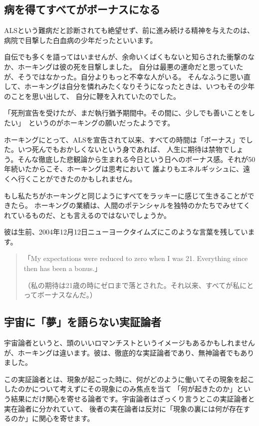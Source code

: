 \documentclass[10pt,b5paper,papersize,dvipdfmx]{jsbook}
\begin{document}
\subsection{病を得てすべてがボーナスになる}
ALSという難病だと診断されても絶望せず、前に進み続ける精神を与えたのは、病院で目撃した白血病の少年だったといいます。\par
自伝でも多くを語ってはいませんが、余命いくばくもないと知らされた衝撃のなか、ホーキングは彼の死を目撃しました。
自分は最悪の運命だと思っていたが、そうではなかった。自分よりもっと不幸な人がいる。
そんなふうに思い直して、ホーキングは自分を憐れみたくなりそうになったときは、いつもその少年のことを思い出して、
自分に鞭を入れていたのでした。\par
「死刑宣告を受けたが、まだ執行猶予期間中。その間に、少しでも善いことをしたい」\,
というのがホーキングの願いだったようです。\par
ホーキングにとって、ALSを宣告されて以来、すべての時間は「ボーナス」でした。いつ死んでもおかしくないという身であれば、
人生に期待は禁物でしょう。そんな徹底した悲観論から生まれる今日という日へのボーナス感。それが50年続いたからこそ、ホーキングは思考において
誰よりもエネルギッシュに、遠くへ行くことができたのかもしれません。\par
もし私たちがホーキングと同じようにすべてをラッキーに感じて生きることができたら。
ホーキングの業績は、人間のポテンシャルを独特のかたちでみせてくれているものだ、とも言えるのではないでしょうか。\par
彼は生前、2004年12月12日ニューヨークタイムズにこのような言葉を残しています。\par
\begin{quote}
「My expectations were reduced to zero when I was 21. Everything since then has been a bonus.」\par
（私の期待は21歳の時にゼロまで落とされた。それ以来、すべてが私にとってボーナスなんだ。）\par
\end{quote}

\subsection{宇宙に「夢」を語らない実証論者}
宇宙論者というと、頭のいいロマンチストというイメージもあるかもしれませんが、ホーキングは違います。彼は、徹底的な実証論者であり、無神論者でもありました。\par
この実証論者とは、現象が起こった時に、何がどのように働いてその現象を起こしたのかについて考えずにその現象にのみ焦点を当て
「何が起きたのか」という結果にだけ関心を寄せる論者です。宇宙論者はざっくり言うとこの実証論者と実在論者に分かれていて、
後者の実在論者は反対に「現象の裏には何が存在するのか」に関心を寄せます。\par
\newpage
\end{document}
